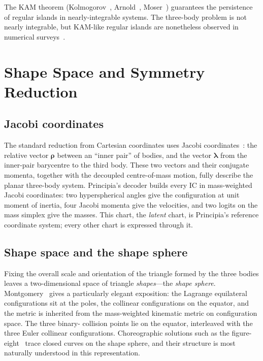 \documentclass[11pt,a4paper]{article}
\begin{document}
The KAM theorem (Kolmogorov~\cite{kolmogorov1954}, Arnold~\cite{arnold1963},
Moser~\cite{moser1962}) guarantees the persistence of regular islands in nearly-integrable
systems.  The three-body problem is not nearly integrable, but KAM-like regular islands are
nonetheless observed in numerical surveys~\cite{trani2024}.

\section{Shape Space and Symmetry Reduction}

\subsection{Jacobi coordinates}

The standard reduction from Cartesian coordinates uses Jacobi coordinates~\cite{jacobi1842}: the
relative vector $\boldsymbol{\rho}$ between an ``inner pair'' of bodies, and the vector
$\boldsymbol{\lambda}$ from the inner-pair barycentre to the third body.  These two vectors and
their conjugate momenta, together with the decoupled centre-of-mass motion, fully describe the
planar three-body system.  Principia's decoder builds every IC in mass-weighted Jacobi
coordinates: two hyperspherical angles give the configuration at unit moment of inertia, four
Jacobi momenta give the velocities, and two logits on the mass simplex give the masses.  This
chart, the \emph{latent} chart, is Principia's reference coordinate system; every other chart is
expressed through it.

\subsection{Shape space and the shape sphere}

Fixing the overall scale and orientation of the triangle formed by the three bodies leaves a
two-dimensional space of triangle \emph{shapes}---the \emph{shape sphere}.
Montgomery~\cite{montgomery2015} gives a particularly elegant exposition: the Lagrange equilateral
configurations sit at the poles, the collinear configurations on the equator, and the metric is
inherited from the mass-weighted kinematic metric on configuration space.  The three binary-
collision points lie on the equator, interleaved with the three Euler collinear configurations.
Choreographic solutions such as the figure-eight~\cite{moore1993,chenciner2000} trace closed curves
on the shape sphere, and their structure is most naturally understood in this representation.
\end{document}
